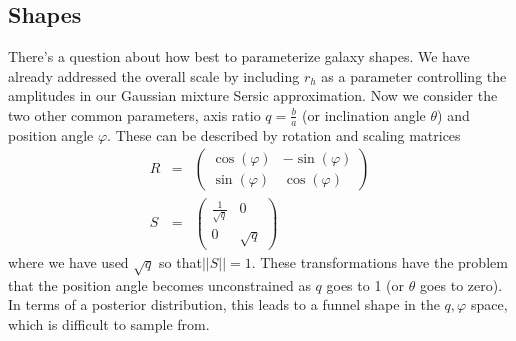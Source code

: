 \documentclass[modern]{aastex62}
\renewcommand{\det}[1]{||{#1}||}
\begin{document}
\subsection{Shapes}
There's a question about how best to parameterize galaxy shapes.
We have already addressed the overall scale by including $r_h$ as a parameter controlling the amplitudes in our Gaussian mixture Sersic approximation.
Now we consider the two other common parameters, axis ratio $q=\frac{b}{a}$ (or inclination angle $\theta$) and position angle $\varphi$.
These can be described by rotation and scaling matrices
\begin{eqnarray}
R & = & \begin{pmatrix} \cos (\varphi) & -\sin(\varphi)\\ \sin(\varphi) & \cos(\varphi)\end{pmatrix} \\
S & = & \begin{pmatrix} \frac{1}{\sqrt{q}} & 0 \\ 0 & \sqrt{q}\end{pmatrix}
\end{eqnarray}
where we have used $\sqrt{q}$ so that$\det{S}=1$.
These transformations have the problem that the position angle becomes unconstrained as $q$ goes to 1 (or $\theta$ goes to zero).
In terms of a posterior distribution, this leads to a funnel shape in the $q, \varphi$ space, which is difficult to sample from.
\end{document}
